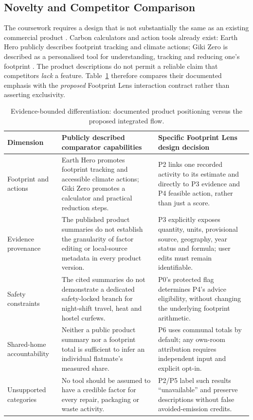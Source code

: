 \documentclass[12pt,a4paper]{article}
\begin{document}
\subsection{Novelty and Competitor Comparison}
The coursework requires a design that is not substantially the same as an existing commercial product \cite{modulebrief}. Carbon calculators and action tools already exist: Earth Hero publicly describes footprint tracking and climate actions; Giki Zero is described as a personalised tool for understanding, tracking and reducing one's footprint \cite{earthhero,gikizero}. The product descriptions do not permit a reliable claim that competitors \emph{lack} a feature. Table~\ref{tab:competitor} therefore compares their documented emphasis with the \emph{proposed} Footprint Lens interaction contract rather than asserting exclusivity.

\begin{table}[ht]
\centering\small
\caption{Evidence-bounded differentiation: documented product positioning versus the proposed integrated flow.}
\label{tab:competitor}
\begin{tabularx}{\textwidth}{|p{2.75cm}|X|X|}
\toprule
\textbf{Dimension}&\textbf{Publicly described comparator capabilities}&\textbf{Specific Footprint Lens design decision}\\
\midrule
Footprint and actions&Earth Hero promotes footprint tracking and accessible climate actions; Giki Zero promotes a calculator and practical reduction steps.&P2 links one recorded activity to its estimate and directly to P3 evidence and P4 feasible action, rather than just a score.\\
\rowcolor{RowGray}
Evidence provenance&The published product summaries do not establish the granularity of factor editing or local-source metadata in every product version.&P3 explicitly exposes quantity, units, provisional source, geography, year status and formula; user edits must remain identifiable.\\
Safety constraints&The cited summaries do not demonstrate a dedicated safety-locked branch for night-shift travel, heat and hostel curfews.&P0's protected flag determines P4's advice eligibility, without changing the underlying footprint arithmetic.\\
\rowcolor{RowGray}
Shared-home accountability&Neither a public product summary nor a footprint total is sufficient to infer an individual flatmate's measured share.&P6 uses communal totals by default; any own-room attribution requires independent input and explicit opt-in.\\
Unsupported categories&No tool should be assumed to have a credible factor for every repair, packaging or waste activity.&P2/P5 label such results ``unavailable'' and preserve descriptions without false avoided-emission credits.\\
\bottomrule
\end{tabularx}
\end{table}
\end{document}
